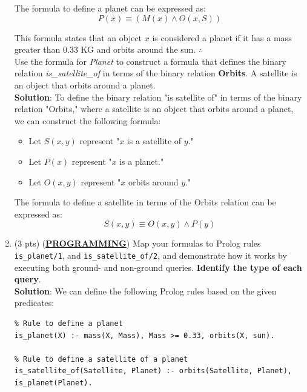 \documentclass[12pt]{article}
\begin{document}
\begin{spacing}{1.5}
\begin{enumerate}
\begin{itemize}
		      \end{itemize}

		      The formula to define a planet can be expressed as:
		      $$P(x)\equiv (M(x) \land O(x, S))$$

		      This formula states that an object $x$ is considered a planet if it has a mass greater than 0.33 KG and orbits around the sun. $\therefore$ \\

		      Use the formula for \textit{Planet} to construct a formula that defines the binary relation
		      \textit{is\_satellite\_of} in terms of the binary relation \textbf{Orbits}. A satellite is an object that orbits around a planet.\\

		      \textbf{Solution}: To define the binary relation "is satellite of" in terms of the binary relation "Orbits," where a satellite is an object that orbits around a planet, we can construct the following formula:

		      \begin{itemize}
		      	
		      	\item Let $S(x,y)$ represent "$x$ is a satellite of $y$."
		      	\item Let $P(x)$ represent "$x$ is a planet."
		      	\item Let $O(x,y)$ represent "$x$ orbits around $y$."
		      	      
		      \end{itemize}

		      The formula to define a satellite in terms of the Orbits relation can be expressed as:
		      $$S(x,y) \equiv O(x,y) \land P(y)$$
		      		      		              
		\item 
		      (3 pts) (\uline{\textbf{PROGRAMMING}}) Map your formulas to Prolog rules \texttt{is\_planet/1}, and
		      \texttt{is\_satellite\_of/2}, and demonstrate how it works by executing both ground- and
		      non-ground queries. \textbf{Identify the type of each query}.\\

		      \textbf{Solution}: We can define the following Prolog rules based on the given predicates:

		      \begin{lstlisting}
% Rule to define a planet
is_planet(X) :- mass(X, Mass), Mass >= 0.33, orbits(X, sun).

% Rule to define a satellite of a planet
is_satellite_of(Satellite, Planet) :- orbits(Satellite, Planet), is_planet(Planet).       
		      \end{lstlisting}


\end{enumerate}
\end{spacing}
\end{document}
